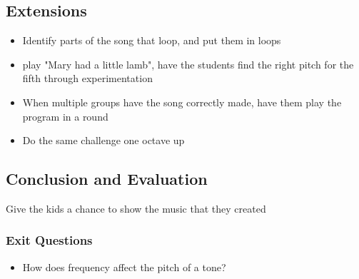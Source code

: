 \documentclass{lessonplan}
\begin{document}
    \subsection{Extensions}
      \begin{itemize}
        \item Identify parts of the song that loop, and put them in
          loops
        \item play "Mary had a little lamb", have the students find
          the right pitch for the fifth through experimentation
        \item When multiple groups have the song correctly made, have
          them play the program in a round
        \item Do the same challenge one octave up
      \end{itemize}
    \subsection{Conclusion and Evaluation}
      Give the kids a chance to show the music that they created
      \subsubsection{Exit Questions}
      \begin{itemize}
        \item How does frequency affect the pitch of a tone?
      \end{itemize}
\end{document}
